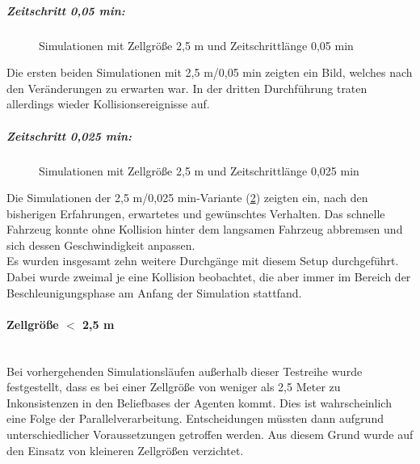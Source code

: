 \subparagraph*{Zeitschritt 0,05 min:}
\begin{figure}[hptb]
  \centering 
   \qquad 
   \qquad 
  \caption{Simulationen mit Zellgröße 2,5 m und Zeitschrittlänge 0,05 min} 
  \label{figure:run24-26}
\end{figure}

Die ersten beiden Simulationen mit 2,5 m/0,05 min zeigten ein Bild, welches nach den Veränderungen zu erwarten war.
In der dritten Durchführung traten allerdings wieder Kollisionsereignisse auf.

\subparagraph*{Zeitschritt 0,025 min:}
\begin{figure}[hptb]
  \centering 
   \qquad 
   \qquad 
  \caption{Simulationen mit Zellgröße 2,5 m und Zeitschrittlänge 0,025 min} 
  \label{figure:run27-29}
\end{figure}

Die Simulationen der 2,5 m/0,025 min-Variante (\cref{figure:run27-29}) zeigten ein, nach den bisherigen Erfahrungen, erwartetes und gewünschtes Verhalten.
Das schnelle Fahrzeug konnte ohne Kollision hinter dem langsamen Fahrzeug abbremsen und sich dessen Geschwindigkeit anpassen.
\\
Es wurden insgesamt zehn weitere Durchgänge mit diesem Setup durchgeführt. 
Dabei wurde zweimal je eine Kollision beobachtet, die aber immer im Bereich der Beschleunigungsphase am Anfang der Simulation stattfand. 


\paragraph*{\texorpdfstring{Zellgröße $ < $ 2,5 m}%
                              {Zellgröße kleiner als 2,5 m}}
\hfill \\
Bei vorhergehenden Simulationsläufen außerhalb dieser Testreihe wurde festgestellt, dass es bei einer Zellgröße von weniger als 2,5 Meter zu Inkonsistenzen in den Beliefbases der Agenten kommt.
Dies ist wahrscheinlich eine Folge der Parallelverarbeitung.
Entscheidungen müssten dann aufgrund unterschiedlicher Voraussetzungen getroffen werden.
Aus diesem Grund wurde auf den Einsatz von kleineren Zellgrößen verzichtet.






